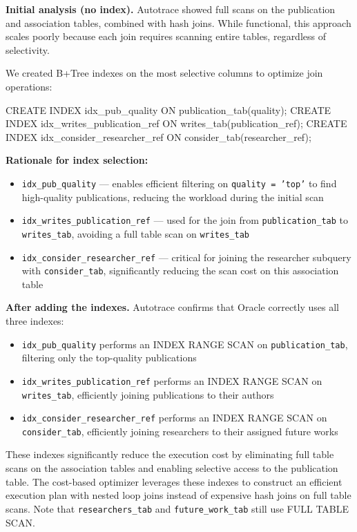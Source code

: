\documentclass[11pt,a4paper]{article}
\begin{document}
\textbf{Initial analysis (no index).} Autotrace showed full scans on the publication and association tables, combined with hash joins. While functional, this approach scales poorly because each join requires scanning entire tables, regardless of selectivity.  

We created B+Tree indexes on the most selective columns to optimize join operations:

\begin{sqlbox}
CREATE INDEX idx_pub_quality         ON publication_tab(quality);
CREATE INDEX idx_writes_publication_ref  ON writes_tab(publication_ref);
CREATE INDEX idx_consider_researcher_ref ON consider_tab(researcher_ref);
\end{sqlbox}

\textbf{Rationale for index selection:}
\begin{itemize}
    \item \texttt{idx\_pub\_quality} — enables efficient filtering on \texttt{quality = 'top'} to find high-quality publications, reducing the workload during the initial scan
    \item \texttt{idx\_writes\_publication\_ref} — used for the join from \texttt{publication\_tab} to \texttt{writes\_tab}, avoiding a full table scan on \texttt{writes\_tab}
    \item \texttt{idx\_consider\_researcher\_ref} — critical for joining the researcher subquery with \texttt{consider\_tab}, significantly reducing the scan cost on this association table
\end{itemize}

\textbf{After adding the indexes.} Autotrace confirms that Oracle correctly uses all three indexes:
\begin{itemize}
    \item \texttt{idx\_pub\_quality} performs an INDEX RANGE SCAN on \texttt{publication\_tab}, filtering only the top-quality publications
    \item \texttt{idx\_writes\_publication\_ref} performs an INDEX RANGE SCAN on \texttt{writes\_tab}, efficiently joining publications to their authors
    \item \texttt{idx\_consider\_researcher\_ref} performs an INDEX RANGE SCAN on \texttt{consider\_tab}, efficiently joining researchers to their assigned future works
\end{itemize}

These indexes significantly reduce the execution cost by eliminating full table scans on the association tables and enabling selective access to the publication table. The cost-based optimizer leverages these indexes to construct an efficient execution plan with nested loop joins instead of expensive hash joins on full table scans. Note that \texttt{researchers\_tab} and \texttt{future\_work\_tab} still use FULL TABLE SCAN.
\end{document}

